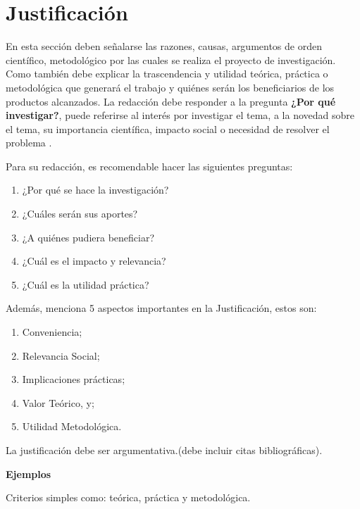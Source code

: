 \chapter{Justificación}
\label{Justificación}

En esta sección deben señalarse las razones, causas, argumentos de orden científico, metodológico por las cuales se realiza el proyecto de investigación. Como también debe explicar la trascendencia y utilidad teórica, práctica o metodológica que generará el trabajo y quiénes serán los beneficiarios de los productos  alcanzados. La redacción debe responder a la pregunta \textbf{¿Por qué investigar?}, puede referirse al interés por investigar el tema, a la novedad sobre el tema, su importancia  científica, impacto social o necesidad de resolver el problema \cite{herrera2004tutoria}.

Para su redacción, es recomendable hacer las siguientes preguntas:
\begin{enumerate}
    \item ¿Por qué se hace la investigación?
    \item ¿Cuáles serán sus aportes?
    \item ¿A quiénes pudiera beneficiar?
    \item ¿Cuál es el impacto y relevancia?
    \item ¿Cuál es la utilidad práctica?
\end{enumerate}

Además, \cite{hernandez2018metodologia} menciona 5 aspectos importantes en la Justificación, estos son:
\begin{enumerate}
    \item Conveniencia;
    \item Relevancia Social;
    \item Implicaciones prácticas;
    \item Valor Teórico, y;
    \item Utilidad Metodológica.
\end{enumerate}

La justificación debe ser argumentativa.(debe incluir citas bibliográficas).

\textbf{Ejemplos}

Criterios simples como: teórica, práctica y metodológica. 


